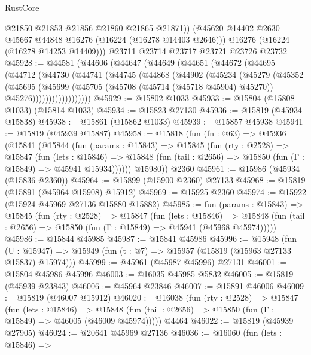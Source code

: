 \begin{lexlean}{RustCore}
\begin{coremodule}
          @21850
          @21853
          @21856
          @21860
          @21865
          @21871))
      (@45620 @14402 @2630 @45667 @44848 @16276 (@16224 (@16278 @14403 @2646)))
      @16276
      (@16224 (@16278 @14253 @14409)))
    @23711
    @23714
    @23717
    @23721
    @23726
    @23732
@45928 := @44581
    (@44606
      (@44647
        (@44649
          (@44651
            (@44672
              (@44695
                (@44712
                  (@44730
                    (@44741
                      (@44745
                        (@44868
                          (@44902
                            (@45234
                              (@45279
                                (@45352
                                  (@45695
                                    (@45699
                                      (@45705
                                        (@45708 (@45714 (@45718 @45904) @45270))
                                        @45276))))))))))))))))))
@45929 := @15802 @1033
@45933 := @15804 (@15808 @1033) (@15814 @1033)
@45934 := @15823 @27130
@45936 := @15819 (@45934 @15838)
@45938 := @15861 (@15862 @1033)
@45939 := @15857 @45938
@45941 := @15819 (@45939 @15887)
@45958 := @15818
    (fun (fn : @63) =>
    @45936
      (@15841
        (@15844
          (fun (params : @15843) =>
          @15845
            (fun (rty : @2528) =>
            @15847
              (fun (lets : @15846) =>
              @15848 (fun (tail : @2656) => @15850 (fun (Γ : @15849) => @45941 @15934))))))
        @15980))
    @2360
@45961 := @15986 (@45934 (@15836 @2360))
@45964 := @15899 (@15900 @2360) @27133
@45968 := @15819 (@15891 (@45964 @15908) @15912)
@45969 := @15925 @2360
@45974 := @15922 (@15924 @45969 @27136 @15880 @15882)
@45985 := fun (params : @15843) =>
  @15845
    (fun (rty : @2528) =>
    @15847
      (fun (lets : @15846) =>
      @15848 (fun (tail : @2656) => @15850 (fun (Γ : @15849) => @45941 (@45968 @45974)))))
@45986 := @15844 @45985
@45987 := @15841 @45986
@45996 := @15948
    (fun (U : @15947) => @15949 (fun (t : @7) => @15957 (@15819 (@15963 @27133 @15837) @15974)))
@45999 := @45961 (@45987 @45996) @27131
@46001 := @15804 @45986 @45996
@46003 := @16035 @45985 @5832
@46005 := @15819 (@45939 @23843)
@46006 := @45964 @23846
@46007 := @15891 @46006
@46009 := @15819 (@46007 @15912)
@46020 := @16038
    (fun (rty : @2528) =>
    @15847
      (fun (lets : @15846) =>
      @15848 (fun (tail : @2656) => @15850 (fun (Γ : @15849) => @46005 (@46009 @45974)))))
    @4464
@46022 := @15819 (@45939 @27905)
@46024 := @20641 @45969 @27136
@46036 := @16060
    (fun (lets : @15846) =>

\end{coremodule}
\end{lexlean}
